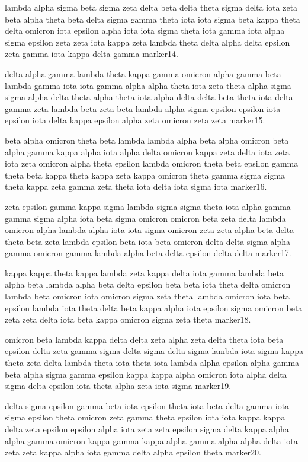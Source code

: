 \documentclass{article}
\begin{document}
lambda alpha sigma beta sigma zeta delta beta delta theta sigma delta iota zeta beta alpha theta beta delta sigma gamma theta iota iota sigma beta kappa theta delta omicron iota epsilon alpha iota iota sigma theta iota gamma iota alpha sigma epsilon zeta zeta iota kappa zeta lambda theta delta alpha delta epsilon zeta gamma iota kappa delta gamma marker14.

delta alpha gamma lambda theta kappa gamma omicron alpha gamma beta lambda gamma iota iota gamma alpha alpha theta iota zeta theta alpha sigma sigma alpha delta theta alpha theta iota alpha delta delta beta theta iota delta gamma zeta lambda beta zeta beta lambda alpha sigma epsilon epsilon iota epsilon iota delta kappa epsilon alpha zeta omicron zeta zeta marker15.

beta alpha omicron theta beta lambda lambda alpha beta alpha omicron beta alpha gamma kappa alpha iota alpha delta omicron kappa zeta delta iota zeta iota zeta omicron alpha theta epsilon lambda omicron theta beta epsilon gamma theta beta kappa theta kappa zeta kappa omicron theta gamma sigma sigma theta kappa zeta gamma zeta theta iota delta iota sigma iota marker16.

zeta epsilon gamma kappa sigma lambda sigma sigma theta iota alpha gamma gamma sigma alpha iota beta sigma omicron omicron beta zeta delta lambda omicron alpha lambda alpha iota iota sigma omicron zeta zeta alpha beta delta theta beta zeta lambda epsilon beta iota beta omicron delta delta sigma alpha gamma omicron gamma lambda alpha beta delta epsilon delta delta marker17.

kappa kappa theta kappa lambda zeta kappa delta iota gamma lambda beta alpha beta lambda alpha beta delta epsilon beta beta iota theta delta omicron lambda beta omicron iota omicron sigma zeta theta lambda omicron iota beta epsilon lambda iota theta delta beta kappa alpha iota epsilon sigma omicron beta zeta zeta delta iota beta kappa omicron sigma zeta theta marker18.

omicron beta lambda kappa delta delta zeta alpha zeta delta theta iota beta epsilon delta zeta gamma sigma delta sigma delta sigma lambda iota sigma kappa theta zeta delta lambda theta iota theta iota lambda alpha epsilon alpha gamma beta alpha sigma gamma epsilon kappa kappa alpha omicron iota alpha delta sigma delta epsilon iota theta alpha zeta iota sigma marker19.

delta sigma epsilon gamma beta iota epsilon theta iota beta delta gamma iota sigma epsilon theta omicron zeta gamma theta epsilon iota iota kappa kappa delta zeta epsilon epsilon alpha iota zeta zeta epsilon sigma delta kappa alpha alpha gamma omicron kappa gamma kappa alpha gamma alpha alpha delta iota zeta zeta kappa alpha iota gamma delta alpha epsilon theta marker20.
\end{document}
